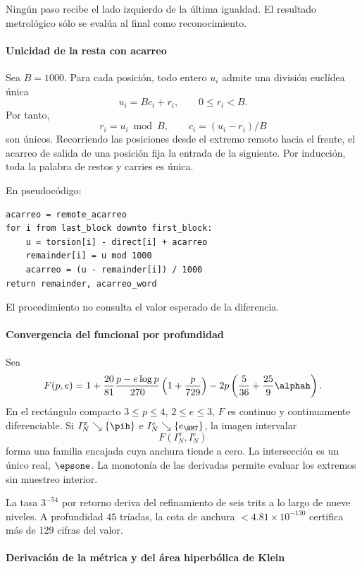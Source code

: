 Ningún paso recibe el lado izquierdo de la última igualdad. El resultado
metrológico sólo se evalúa al final como reconocimiento.

\paragraph{Unicidad de la resta con acarreo}

Sea \(B=1000\). Para cada posición, todo entero \(u_i\) admite una división
euclídea única
\[
u_i=Bc_i+r_i,\qquad 0\le r_i<B.
\]
Por tanto,
\[
r_i=u_i\bmod B,\qquad c_i=(u_i-r_i)/B
\]
son únicos. Recorriendo las posiciones desde el extremo remoto hacia el
frente, el acarreo de salida de una posición fija la entrada de la siguiente.
Por inducción, toda la palabra de restos y carries es única.

En pseudocódigo:
\begin{verbatim}
acarreo = remote_acarreo
for i from last_block downto first_block:
    u = torsion[i] - direct[i] + acarreo
    remainder[i] = u mod 1000
    acarreo = (u - remainder[i]) / 1000
return remainder, acarreo_word
\end{verbatim}
El procedimiento no consulta el valor esperado de la diferencia.

\paragraph{Convergencia del funcional por profundidad}

Sea
\[
F(p,e)=1+\frac{20}{81}
\frac{p-e\log p}{270}\left(1+\frac{p}{729}\right)
-2p\left(\frac5{36}+\frac{25}{9}\alphah\right).
\]
En el rectángulo compacto \(3\le p\le4\), \(2\le e\le3\), \(F\) es
continuo y continuamente diferenciable. Si \(I_N^\pi\searrow\{\pih\}\) e
\(I_N^e\searrow\{e_{\HMT}\}\), la imagen intervalar
\[
F(I_N^\pi,I_N^e)
\]
forma una familia encajada cuya anchura tiende a cero. La intersección es un
único real, \(\epsone\). La monotonía de las derivadas permite evaluar los
extremos sin muestreo interior.

La tasa \(3^{-54}\) por retorno deriva del refinamiento de seis trits a lo
largo de nueve niveles. A profundidad \(45\) tríadas, la cota de anchura
\(<4.81\times10^{-130}\) certifica más de 129 cifras del valor.

\paragraph{Derivación de la métrica y del área hiperbólica de Klein}

